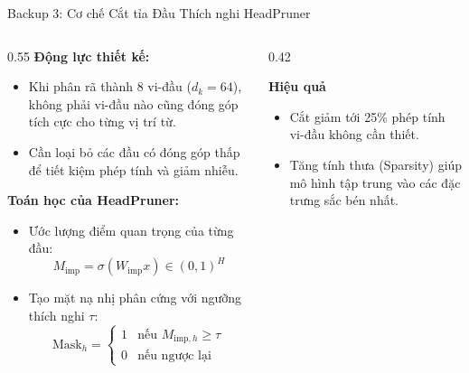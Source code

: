 \documentclass[aspectratio=169, 10pt]{beamer}
\begin{document}
\begin{frame}{Backup 3: Cơ chế Cắt tỉa Đầu Thích nghi HeadPruner}
  \begin{columns}
    \begin{column}{0.55\textwidth}
      \textbf{Động lực thiết kế:}
      \begin{itemize}
        \item Khi phân rã thành 8 vi-đầu ($d_k=64$), không phải vi-đầu nào cũng đóng góp tích cực cho từng vị trí từ.
        \item Cần loại bỏ các đầu có đóng góp thấp để tiết kiệm phép tính và giảm nhiễu.
      \end{itemize}
      \vspace{0.2cm}
      \textbf{Toán học của HeadPruner:}
      \begin{itemize}
        \item Ước lượng điểm quan trọng của từng đầu:
          $$M_{\text{imp}} = \sigma(W_{\text{imp}} x) \in (0, 1)^{H}$$
        \item Tạo mặt nạ nhị phân cứng với ngưỡng thích nghi $\tau$:
          $$\text{Mask}_h = \begin{cases} 1 & \text{nếu } M_{\text{imp}, h} \ge \tau \\ 0 & \text{nếu ngược lại} \end{cases}$$
      \end{itemize}
    \end{column}
    \begin{column}{0.42\textwidth}
      \begin{block}{\textbf{Hiệu quả}}
        \begin{itemize}
          \item Cắt giảm tới 25\% phép tính vi-đầu không cần thiết.
          \item Tăng tính thưa (Sparsity) giúp mô hình tập trung vào các đặc trưng sắc bén nhất.
        \end{itemize}
      \end{block}
    \end{column}
  \end{columns}
\end{frame}
\end{document}
